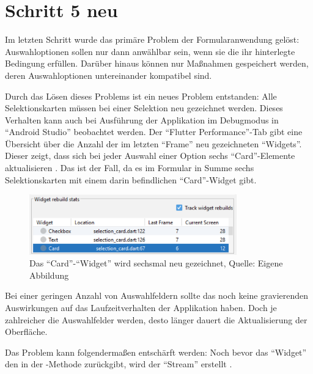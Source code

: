 \chapter{Schritt 5 neu}
\label{chap:Schritt-5}

Im letzten Schritt wurde das primäre Problem der Formularanwendung gelöst:
Auswahloptionen sollen nur dann anwählbar sein,
wenn sie die ihr hinterlegte Bedingung erfüllen.
Darüber hinaus können nur Maßnahmen gespeichert werden,
deren Auswahloptionen untereinander kompatibel sind.

Durch das Lösen dieses Problems ist ein neues Problem entstanden:
Alle Selektionskarten müssen bei einer Selektion neu gezeichnet werden.
Dieses Verhalten kann auch bei Ausführung der Applikation im Debugmodus in \enquote{Android Studio} beobachtet werden.
Der \enquote{Flutter Performance}-Tab gibt eine Übersicht über die Anzahl der im letzten \enquote{Frame} neu gezeichneten \enquote{Widgets}. 
Dieser zeigt, dass sich bei jeder Auswahl einer Option sechs \enquote{Card}-Elemente aktualisieren \Abb{\ref{fig:Schritt5_6rebuilds}}.
Das ist der Fall, da es im Formular in Summe sechs Selektionskarten mit einem darin befindlichen \enquote{Card}-Widget gibt.

\begin{figure}[ht]
  \centering
  \ifIncludeFigures
  \includegraphics[width=0.8\textwidth]{Inhalt/Hauptteil/Implementierung/Schritt-5/6rebuilds.png}
  \fi
  \caption[Das \enquote{Card}-\enquote{Widget} wird sechsmal neu gezeichnet]{Das \enquote{Card}-\enquote{Widget} wird sechsmal neu gezeichnet, Quelle: Eigene Abbildung}
  
  \label{fig:Schritt5_6rebuilds}
\end{figure}%


Bei einer geringen Anzahl von Auswahlfeldern sollte das noch keine gravierenden Auswirkungen auf das Laufzeitverhalten der Applikation haben.
Doch je zahlreicher die Auswahlfelder werden,
desto länger dauert die Aktualisierung der Oberfläche.

Das Problem kann folgendermaßen entschärft werden:
Noch bevor das \enquote{Widget}  den  in der -Methode zurückgibt,
wird der \enquote{Stream}  erstellt .

